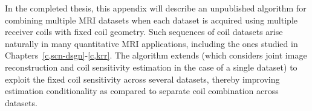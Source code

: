 
In the completed thesis,
this appendix will describe 
an unpublished algorithm
for combining multiple MRI datasets
when each dataset is acquired 
using multiple receiver coils
with fixed coil geometry.
Such sequences of coil datasets arise naturally
in many quantitative MRI applications,
including the ones studied
in Chapters~\ref{c,scn-dsgn}-\ref{c,krr}.
The algorithm extends \cite{ying:07:jir}
(which considers joint image reconstruction
and coil sensitivity estimation
in the case of a single dataset)
to exploit the fixed coil sensitivity 
across several datasets,
thereby improving estimation conditionality
as compared to separate coil combination
across datasets. 
